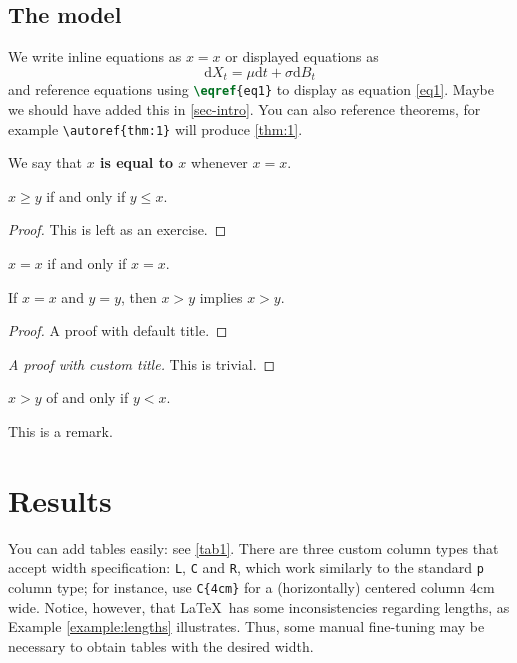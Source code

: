 \documentclass[fleqn]{rbfin}
\begin{document}
\subsection{The model}

We write inline equations as \(x=x\) or displayed equations as
\begin{equation}\label{eq1}
\mathrm dX_t = \mu\mathrm dt + \sigma\mathrm dB_t
\end{equation}
and reference equations using \lstinline[language=TeX]/\eqref{eq1}/ to display as equation \eqref{eq1}. Maybe we should have added this in \autoref{sec-intro}. You can also reference theorems, for example \lstinline/\autoref{thm:1}/ will produce \autoref{thm:1}.

\begin{definition}
We say that \textbf{$x$ is equal to $x$} whenever $x=x$.
\end{definition}

\begin{lemma}
$x\geq y$ if and only if $y\leq x$.
\end{lemma}
\begin{proof}
This is left as an exercise.
\end{proof}

\begin{proposition}
$x = x$ if and only if $x = x$.
\end{proposition}

\begin{theorem}\label{thm:1}
If $x=x$ and $y=y$, then $x>y$ implies $x>y$.
\end{theorem}

\begin{proof}
A proof with default title.
\end{proof}

\begin{proof}[A proof with custom title]
This is trivial.
\end{proof}

\begin{corollary}
$x>y$ of and only if $y<x$.
\end{corollary}

\begin{remark}
This is a remark.
\end{remark}

\lipsum[2-2]

\section{Results}
You can add tables easily: see \autoref{tab1}. There are three custom column types that accept width specification: \lstinline[]/L/, \lstinline[]/C/ and \lstinline[]/R/, which work similarly to the standard \lstinline[]/p/ column type; for instance, use \lstinline[]/C{4cm}/ for a (horizontally) centered column 4cm wide. Notice, however, that \LaTeX\ has some inconsistencies regarding lengths, as Example \ref{example:lengths} illustrates. Thus, some manual fine-tuning may be necessary to obtain tables with the desired width.
\end{document}
